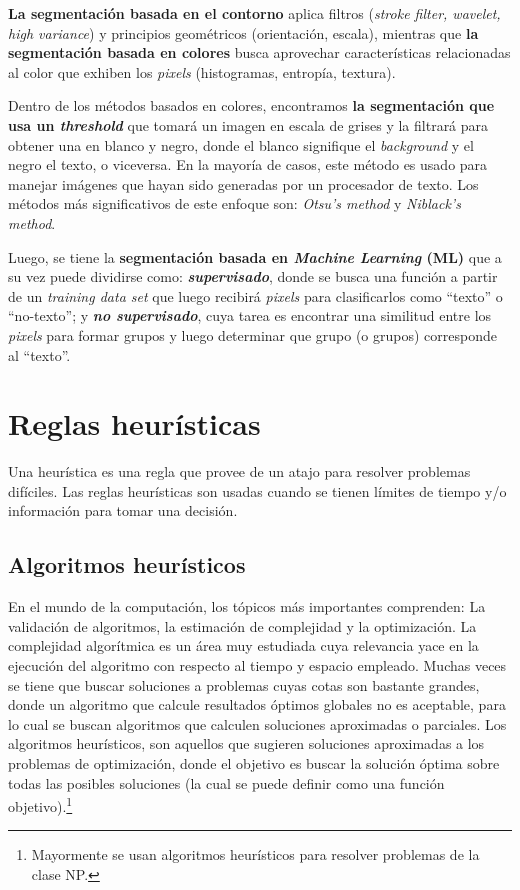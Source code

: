 \textbf{La segmentación basada en el contorno} aplica filtros (\textit{stroke
filter, wavelet, high variance}) y principios geométricos (orientación, 
escala), mientras que \textbf{la segmentación basada en colores} busca 
aprovechar características relacionadas al color que exhiben los \textit{pixels}
(histogramas, entropía, textura).

Dentro de los métodos basados en colores, encontramos \textbf{la segmentación
que usa un \textit{threshold}} que tomará un imagen en escala de grises y la
filtrará  para obtener una en blanco y negro, donde el blanco signifique el
\textit{background} y el negro el texto, o viceversa. En la mayoría de casos, 
este método es usado para manejar imágenes que hayan sido generadas por un 
procesador de texto. Los métodos más significativos de este enfoque son: 
\textit{Otsu's method} y \textit{Niblack's method}.\cite{Sezgin:2004:Survey}

Luego, se tiene la \textbf{segmentación basada en \textit{Machine Learning} 
(ML)} que a su vez puede dividirse como: \textbf{\textit{supervisado}}, donde 
se busca una función a partir de un \textit{training data set} que luego 
recibirá \textit{pixels} para clasificarlos como ``texto'' o ``no-texto''; y
\textbf{\textit{no supervisado}}, cuya tarea es encontrar una similitud entre
los \textit{pixels} para formar grupos y luego determinar que grupo (o grupos) 
corresponde al ``texto''.

\section{Reglas heurísticas}
\label{sec:heuristicas}
Una heurística es una regla que provee de un atajo para resolver problemas 
difíciles. Las reglas heurísticas son usadas cuando se tienen límites de
tiempo y/o información para tomar una decisión.
\subsection{Algoritmos heurísticos}
  En el mundo de la computación, los tópicos más importantes comprenden: La 
  validación de algoritmos, la estimación de complejidad y la optimización. La
  complejidad algorítmica es un área muy estudiada cuya relevancia yace en la 
  ejecución del algoritmo con respecto al tiempo y espacio empleado. Muchas 
  veces se tiene que buscar soluciones a problemas cuyas cotas son bastante 
  grandes, donde un algoritmo que calcule resultados óptimos globales no es 
  aceptable, para lo cual se buscan algoritmos que calculen soluciones 
  aproximadas o parciales. Los algoritmos heurísticos, son aquellos que 
  sugieren soluciones aproximadas a los problemas de optimización, donde el
  objetivo es buscar la solución óptima sobre todas las posibles soluciones 
  (la cual se puede definir como una función objetivo).\footnote{Mayormente se
  usan algoritmos heurísticos para resolver problemas de la clase NP.}
